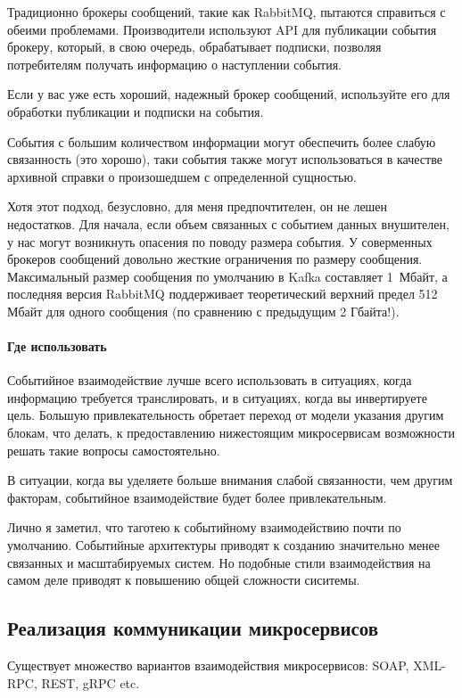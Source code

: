 \documentclass[%
	11pt,
	a4paper,
	utf8,
		]{article}
\begin{document}
Традиционно брокеры сообщений, такие как RabbitMQ, пытаются справиться с обеими проблемами. Производители используют API для публикации события брокеру, который, в свою очередь, обрабатывает подписки, позволяя потребителям получать информацию о наступлении события.

Если у вас уже есть хороший, надежный брокер сообщений, используйте его для обработки публикации и подписки на события.

События с большим количеством информации могут обеспечить более слабую связанность (это хорошо), таки события также могут использоваться в качестве архивной справки о произошедшем с определенной сущностью.

Хотя этот подход, безусловно, для меня предпочтителен, он не лешен недостатков. Для начала, если объем связанных с событием данных внушителен, у нас могут возникнуть опасения по поводу размера события. У соверменных брокеров сообщений довольно жесткие ограничения по размеру сообщения. Максимальный размер сообщения по умолчанию в Kafka составляет 1~Мбайт, а последняя версия RabbitMQ поддерживает теоретический верхний предел 512 Мбайт для одного сообщения (по сравнению с предыдущим 2 Гбайта!). 

\paragraph{Где использовать}

Событийное взаимодействие лучше всего использовать в ситуациях, когда информацию требуется транслировать, и в ситуациях, когда вы инвертируете цель. Большую привлекательность обретает переход от модели указания другим блокам, что делать, к предоставлению нижестоящим микросервисам возможности решать такие вопросы самостоятельно.

В ситуации, когда вы уделяете больше внимания слабой связанности, чем другим факторам, событийное взаимодействие будет более привлекательным.

Лично я заметил, что таготею к событийному взаимодействию почти по умолчанию. Событийные архитектуры приводят к созданию значительно менее связанных и масштабируемых систем. Но подобные стили взаимодействия на самом деле приводят к повышению общей сложности сиситемы.

\subsection{Реализация коммуникации микросервисов}

Существует множество вариантов взаимодействия микросервисов: SOAP, XML-RPC, REST, gRPC etc.
\end{document}
